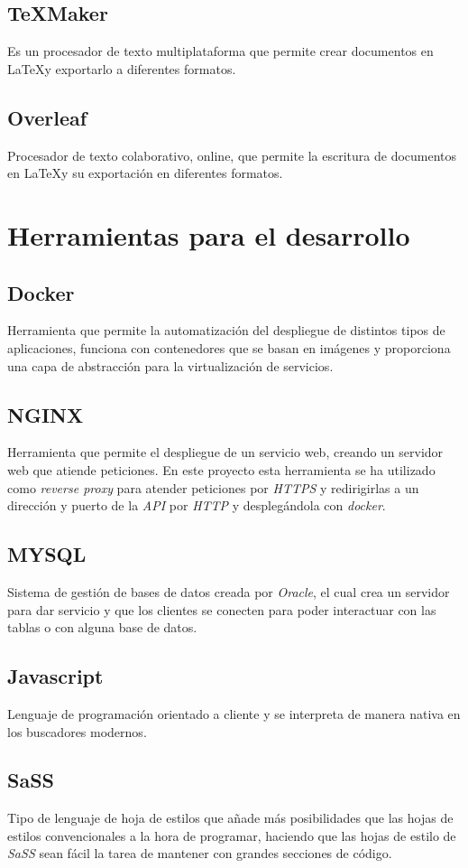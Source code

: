 \subsection{TeXMaker}
Es un procesador de texto multiplataforma que permite crear documentos en \LaTeX y exportarlo a diferentes formatos.
\subsection{Overleaf}
Procesador de texto colaborativo, online, que permite la escritura de documentos en \LaTeX y su exportación en diferentes formatos.
\section{Herramientas para el desarrollo}
\subsection{Docker}
Herramienta que permite la automatización del despliegue de distintos tipos de aplicaciones, funciona con contenedores que se basan en imágenes y proporciona una capa de abstracción para la virtualización de servicios.
\subsection{NGINX}
Herramienta que permite el despliegue de un servicio web, creando un servidor web que atiende peticiones.
En este proyecto esta herramienta se ha utilizado como \textit{reverse proxy} para atender peticiones por \textit{HTTPS }y redirigirlas a un dirección y puerto de la \textit{API} por \textit{HTTP} y desplegándola con \textit{docker}.
\subsection{MYSQL}
Sistema de gestión de bases de datos creada por \textit{Oracle}, el cual crea un servidor para dar servicio y que los clientes se conecten para poder interactuar con las tablas o con alguna base de datos.
\subsection{Javascript}
Lenguaje de programación orientado a cliente y se interpreta de manera nativa en los buscadores modernos.
\subsection{SaSS}
Tipo de lenguaje de hoja de estilos que añade más posibilidades que las hojas de estilos convencionales a la hora de programar, haciendo que las hojas de estilo de \textit{SaSS} sean fácil la tarea de mantener con grandes secciones de código.


